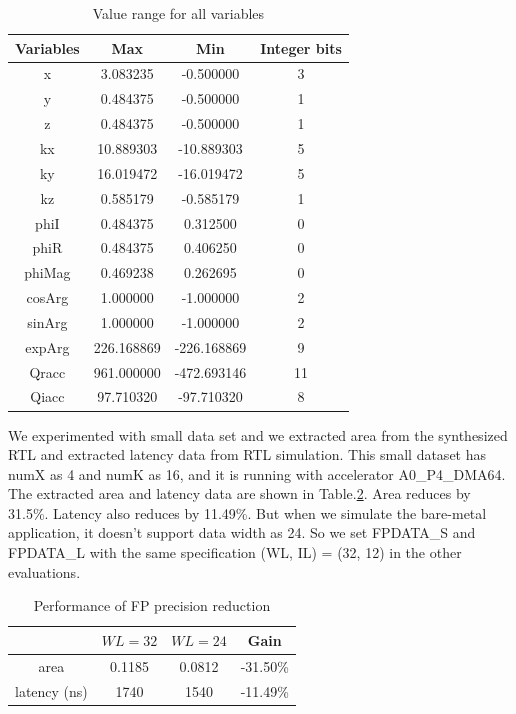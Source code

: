 \documentclass{sig-alternate}
\begin{document}
\begin{table}[ht!]
    \centering
    \begin{tabular}{c|c|c|c}
    \hline \hline
   Variables &       Max&    Min& Integer bits\\
   \hline \hline
 x&     3.083235        &-0.500000& 3 \\
 y&     0.484375        &-0.500000& 1 \\
 z&     0.484375        &-0.500000& 1 \\
 kx&    10.889303       &-10.889303& 5 \\
 ky&    16.019472       &-16.019472& 5 \\
 kz&    0.585179        &-0.585179& 1\\
 phiI   &0.484375       &0.312500& 0 \\
 phiR   &0.484375       &0.406250& 0 \\
 phiMag &0.469238       &0.262695& 0 \\
 cosArg&        1.000000        &-1.000000& 2\\
 sinArg &1.000000       &-1.000000& 2 \\
 \hline
 expArg &226.168869     &-226.168869& 9 \\
 Qracc  &961.000000     &-472.693146& 11 \\
 Qiacc  &97.710320      &-97.710320& 8 \\
\hline \hline
    \end{tabular}
    \caption{Value range for all variables}
    \label{tab-8}
\end{table}




We experimented with small data set and we extracted area from the synthesized RTL and extracted latency data from RTL simulation. This small dataset has numX as 4 and numK as 16, and it is running with accelerator A0\_P4\_DMA64. The extracted area and latency data are shown in Table.\ref{tab-3}. Area reduces by 31.5\%. Latency also reduces by 11.49\%. But when we simulate the bare-metal application, it doesn't support data width as 24. So we set FPDATA\_S and FPDATA\_L with the same specification (WL, IL) = (32, 12) in the other evaluations.
\\
\begin{table}[h!]
    \centering
    \begin{tabular}{c|c|c|c}
    \hline
        & $WL=32$ & $WL=24$ &  Gain \\
        \hline
   area &  0.1185  & 0.0812   & -31.50\% \\ 
latency (ns) &  1740 &  1540  & -11.49\% \\
    \hline
    \end{tabular}
    \caption{Performance of FP precision reduction}
    \label{tab-3}
\end{table}
 \\ 
\end{document}
